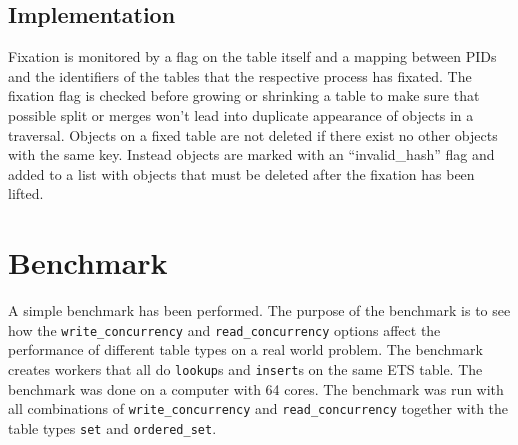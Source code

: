 \documentclass[aps,pre,preprint,nofootinbib]{revtex4}
\begin{document}
\subsection{Implementation}

Fixation is monitored by a flag on the table itself and a mapping between PIDs and the identifiers of the tables that the respective process has fixated.
The fixation flag is checked before growing or shrinking a table to make sure that possible split or merges won't lead into duplicate appearance of objects in a traversal.
Objects on a fixed table are not deleted if there exist no other objects with the same key.
Instead objects are marked with an ``invalid\_hash'' flag and added to a list with objects that must be deleted after the fixation has been lifted.

\section{Benchmark} \label{sec:benchmark}

  A simple benchmark has been performed.
  The purpose of the benchmark is to see how the \verb|write_concurrency| and \verb|read_concurrency| options affect the performance of different table types on a real world problem.
  The benchmark creates workers that all do \verb|lookup|s and \verb|insert|s on the same ETS table.
  The benchmark was done on a computer with 64 cores.
  The benchmark was run with all combinations of \verb|write_concurrency| and \verb|read_concurrency| together with the table types \verb|set| and \verb|ordered_set|.
  
\end{document}
